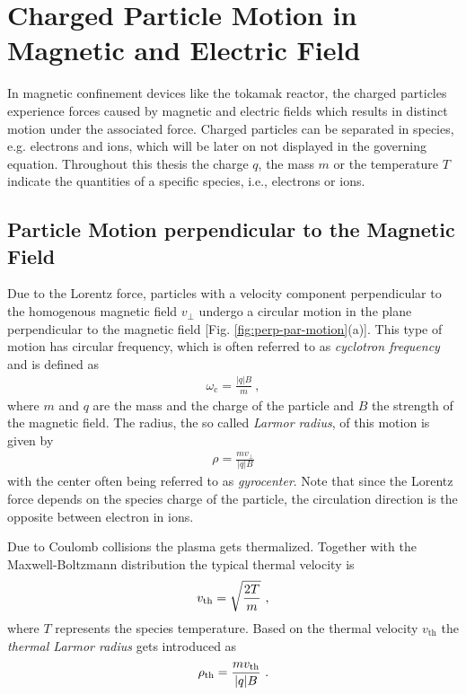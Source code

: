\section{Charged Particle Motion in Magnetic and Electric Field}
\label{sec:motion}

In magnetic confinement devices like the tokamak reactor, the charged particles experience forces caused by magnetic and electric fields which results in distinct motion under the associated force. Charged particles can be separated in species, e.g. electrons and ions, which will be later on not displayed in the governing equation. Throughout this thesis the charge $q$, the mass $m$ or the temperature $T$ indicate the quantities of a specific species, i.e., electrons or ions.

\subsection{Particle Motion perpendicular to the Magnetic Field}
\label{sub:gyromotion}

Due to the Lorentz force, particles with a velocity component perpendicular to the homogenous magnetic field $v_{\perp}$ undergo a circular motion in the plane perpendicular to the magnetic field [Fig. \ref{fig:perp-par-motion}(a)]. This type of motion has circular frequency, which is often referred to as \textit{cyclotron frequency} and is defined as
\begin{gather}
    \omega_\mathrm{c} = \frac{|q|B}{m}~,
    \label{eq:cyclotron}
\end{gather}
where $m$ and $q$ are the mass and the charge of the particle and $B$ the strength of the magnetic field. The radius, the so called \textit{Larmor radius}, of this motion is given by
\begin{gather}
    \rho = \frac{mv_{\perp}}{|q|B}
    \label{eq:Larmorradius}
\end{gather}
with the center often being referred to as \textit{gyrocenter}. Note that since the Lorentz force depends on the species charge of the particle, the circulation direction is the opposite between electron in ions.\\\bigskip

Due to Coulomb collisions the plasma gets thermalized. Together with the Maxwell-Boltzmann distribution the typical thermal velocity is
\begin{gather}
    v_\mathrm{th} = \sqrt{\frac{2T}{m}}~,
    \label{eq:thermalVelocity}
\end{gather}
where $T$ represents the species temperature. Based on the thermal velocity $v_\mathrm{th}$ the \textit{thermal Larmor radius} gets introduced as \cite{Wesson2004}
\begin{gather}
    \rho_{\mathrm{th}} = \frac{mv_\mathrm{th}}{|q|B}~.
    \label{eq:thermalLarmorradius}
\end{gather}

